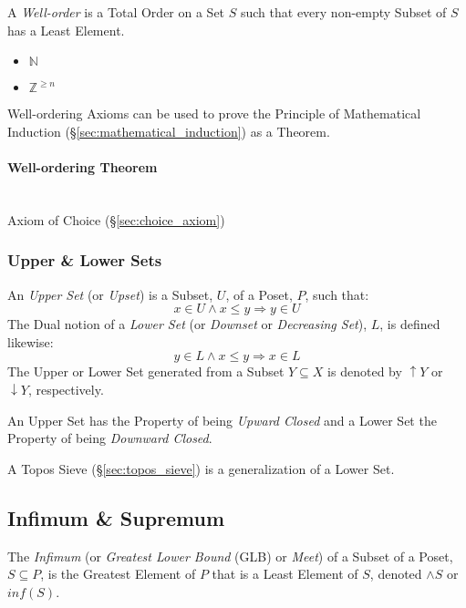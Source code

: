 A \emph{Well-order} is a Total Order on a Set $S$ such that every
non-empty Subset of $S$ has a Least Element.

\begin{itemize}
  \item $\mathbb{N}$
  \item $\mathbb{Z}^{\geq n}$
\end{itemize}

Well-ordering Axioms can be used to prove the Principle of
Mathematical Induction (\S\ref{sec:mathematical_induction}) as a
Theorem.


\paragraph{Well-ordering Theorem}\label{sec:wellorder_theorem}
\hfill \\

Axiom of Choice (\S\ref{sec:choice_axiom})



\subsubsection{Upper \& Lower Sets}\label{sec:upper_lower}

An \emph{Upper Set} (or \emph{Upset}) is a Subset, $U$, of a Poset,
$P$, such that:
\[
  x \in U \wedge x \leq y \Rightarrow y \in U
\]
The Dual notion of a \emph{Lower Set} (or \emph{Downset} or
\emph{Decreasing Set}), $L$, is defined likewise:
\[
  y \in L \wedge x \leq y \Rightarrow x \in L
\]
The Upper or Lower Set generated from a Subset $Y \subseteq X$ is
denoted by $\uparrow Y$ or $\downarrow Y$, respectively.

An Upper Set has the Property of being \emph{Upward Closed} and a
Lower Set the Property of being \emph{Downward Closed}.

A Topos Sieve (\S\ref{sec:topos_sieve}) is a generalization of a Lower
Set.



\subsection{Infimum \& Supremum}\label{sec:glb_lub}

The \emph{Infimum} (or \emph{Greatest Lower Bound} (GLB) or
\emph{Meet}) of a Subset of a Poset, $S \subseteq P$, is the Greatest
Element of $P$ that is a Least Element of $S$, denoted $\wedge S$ or
$inf (S)$.

